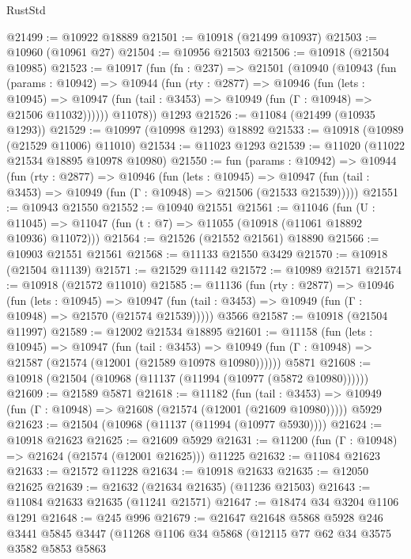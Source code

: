 \begin{lexlean}{RustStd}
\begin{coremodule}
{{{{{{{{{{{{{{{{{{{@21499 := @10922 @18889
@21501 := @10918 (@21499 @10937)
@21503 := @10960 (@10961 @27)
@21504 := @10956 @21503
@21506 := @10918 (@21504 @10985)
@21523 := @10917
    (fun (fn : @237) =>
    @21501
      (@10940
        (@10943
          (fun (params : @10942) =>
          @10944
            (fun (rty : @2877) =>
            @10946
              (fun (lets : @10945) =>
              @10947 (fun (tail : @3453) => @10949 (fun (Γ : @10948) => @21506 @11032))))))
        @11078))
    @1293
@21526 := @11084 (@21499 (@10935 @1293))
@21529 := @10997 (@10998 @1293) @18892
@21533 := @10918 (@10989 (@21529 @11006) @11010)
@21534 := @11023 @1293
@21539 := @11020 (@11022 @21534 @18895 @10978 @10980)
@21550 := fun (params : @10942) =>
  @10944
    (fun (rty : @2877) =>
    @10946
      (fun (lets : @10945) =>
      @10947 (fun (tail : @3453) => @10949 (fun (Γ : @10948) => @21506 (@21533 @21539)))))
@21551 := @10943 @21550
@21552 := @10940 @21551
@21561 := @11046
    (fun (U : @11045) => @11047 (fun (t : @7) => @11055 (@10918 (@11061 @18892 @10936) @11072)))
@21564 := @21526 (@21552 @21561) @18890
@21566 := @10903 @21551 @21561
@21568 := @11133 @21550 @3429
@21570 := @10918 (@21504 @11139)
@21571 := @21529 @11142
@21572 := @10989 @21571
@21574 := @10918 (@21572 @11010)
@21585 := @11136
    (fun (rty : @2877) =>
    @10946
      (fun (lets : @10945) =>
      @10947 (fun (tail : @3453) => @10949 (fun (Γ : @10948) => @21570 (@21574 @21539)))))
    @3566
@21587 := @10918 (@21504 @11997)
@21589 := @12002 @21534 @18895
@21601 := @11158
    (fun (lets : @10945) =>
    @10947
      (fun (tail : @3453) =>
      @10949 (fun (Γ : @10948) => @21587 (@21574 (@12001 (@21589 @10978 @10980))))))
    @5871
@21608 := @10918 (@21504 (@10968 (@11137 (@11994 (@10977 (@5872 @10980))))))
@21609 := @21589 @5871
@21618 := @11182
    (fun (tail : @3453) => @10949 (fun (Γ : @10948) => @21608 (@21574 (@12001 (@21609 @10980)))))
    @5929
@21623 := @21504 (@10968 (@11137 (@11994 (@10977 @5930))))
@21624 := @10918 @21623
@21625 := @21609 @5929
@21631 := @11200 (fun (Γ : @10948) => @21624 (@21574 (@12001 @21625))) @11225
@21632 := @11084 @21623
@21633 := @21572 @11228
@21634 := @10918 @21633
@21635 := @12050 @21625
@21639 := @21632 (@21634 @21635) (@11236 @21503)
@21643 := @11084 @21633 @21635 (@11241 @21571)
@21647 := @18474 @34 @3204 @1106 @1291
@21648 := @245 @996
@21679 := @21647
    @21648
    @5868
    @5928
    @246
    @3441
    @5845
    @3447
    (@11268
      @1106
      @34
      @5868
      (@12115
        @77
        @62
        @34
        @3575
        @3582
        @5853
        @5863
}}}}}}}}}}}}}}}}}}}
\end{coremodule}
\end{lexlean}
